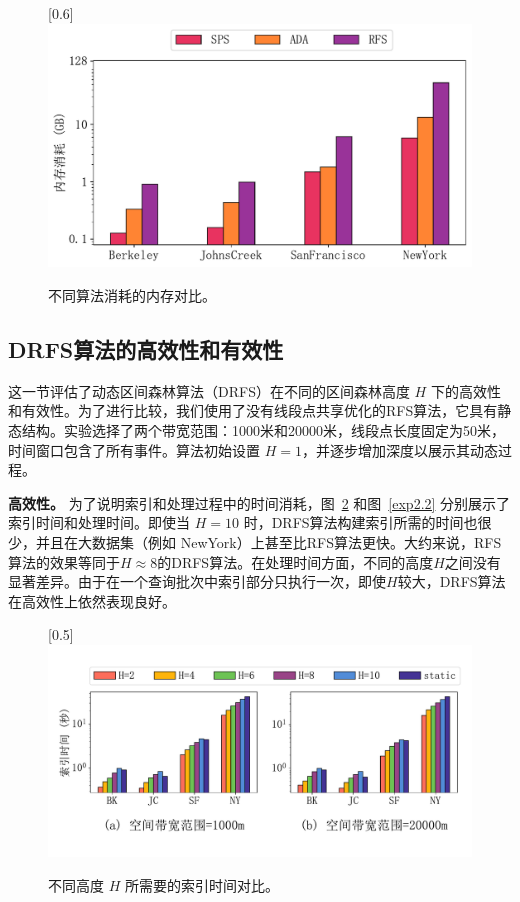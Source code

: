 \begin{figure}[h]\centering
	\scalebox{0.6}[0.6]{\includegraphics{./figures/EXP_Memory_zh.pdf}}
	\caption{不同算法消耗的内存对比。}
	\label{exp1.5}
\end{figure}


\subsection{DRFS算法的高效性和有效性}

这一节评估了动态区间森林算法（DRFS）在不同的区间森林高度 $H$ 下的高效性和有效性。为了进行比较，我们使用了没有线段点共享优化的RFS算法，它具有静态结构。实验选择了两个带宽范围：1000米和20000米，线段点长度固定为50米，时间窗口包含了所有事件。算法初始设置 $H=1$，并逐步增加深度以展示其动态过程。

\textbf{高效性。} 为了说明索引和处理过程中的时间消耗，图~\ref{exp2.1} 和图~\ref{exp2.2} 分别展示了索引时间和处理时间。即使当 $H=10$ 时，DRFS算法构建索引所需的时间也很少，并且在大数据集（例如 NewYork）上甚至比RFS算法更快。大约来说，RFS算法的效果等同于$H \approx 8$的DRFS算法。在处理时间方面，不同的高度$H$之间没有显著差异。由于在一个查询批次中索引部分只执行一次，即使$H$较大，DRFS算法在高效性上依然表现良好。

\begin{figure}[h]\centering
	\scalebox{0.5}[0.5]{\includegraphics{./figures/EXP_H_PrepareTime_zh.pdf}}
	\vspace{-1em}
	\caption{不同高度 $H$ 所需要的索引时间对比。}
	\label{exp2.1}
\end{figure}

